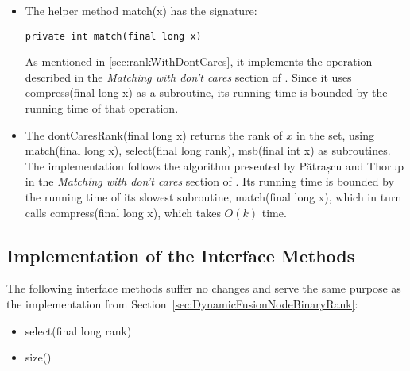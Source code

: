 \begin{itemize}
    \item
    The helper method {\ttfamily match(x)} has the signature:
    \begin{lstlisting}
private int match(final long x)
    \end{lstlisting}
    As mentioned in \ref{sec:rankWithDontCares}, it implements the operation described in the \textit{Matching with don't cares} section of \cite{patrascu2014dynamic}.
    Since it uses {\ttfamily compress(final long x)} as a subroutine, its running time is bounded by the running time of that operation.
    
    \item
    The {\ttfamily dontCaresRank(final long x)} returns the rank of $x$ in the set, using {\ttfamily match(final long x)}, {\ttfamily select(final long rank)}, {\ttfamily msb(final int x)} as subroutines.
    The implementation follows the algorithm presented by Pătrașcu and Thorup in the \textit{Matching with don't cares} section of \cite{patrascu2014dynamic}.
    Its running time is bounded by the running time of its slowest subroutine, {\ttfamily match(final long x)}, which in turn calls {\ttfamily compress(final long x)}, which takes $O(k)$ time.

\end{itemize}

\subsection{Implementation of the Interface Methods} \label{sec:dontCaresRankInterfaceImplementation}

The following interface methods suffer no changes and serve the same purpose as the implementation from Section~\ref{sec:DynamicFusionNodeBinaryRank}:
\begin{itemize}
    \item
    {\ttfamily select(final long rank)}
    
    \item
    {\ttfamily size()}
\end{itemize}

